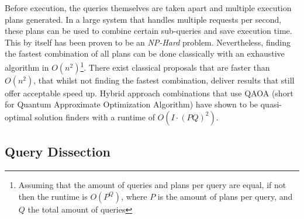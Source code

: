 Before execution, the queries themselves are taken apart and multiple execution plans generated\cite{microsoft_execution_nodate}. In a large system that handles multiple requests per second, these plans can be used to combine certain sub-queries and save execution time\cite{roy_multi-query_2009}. This by itself has been proven to be an \emph{NP-Hard} problem\cite{}. Nevertheless, finding the fastest combination of all plans can be done classically with an exhaustive algorithm in $O(n^2)$\footnote{Assuming that the amount of queries and plans per query are equal, if not then the runtime is $O(P^Q)$, where $P$ is the amount of plans per query, and $Q$ the total amount of queries}. There exist classical proposals that are faster than $O(n^2)$\cite{}, that whilst not finding the fastest combination, deliver results that still offer acceptable speed up. Hybrid approach combinations that use QAOA (short for Quantum Approximate Optimization Algorithm)\cite{} have shown to be quasi-optimal solution finders with a runtime of $O(I \cdot (PQ)^2)$.\par

\subsection{Query Dissection}







\newpage
